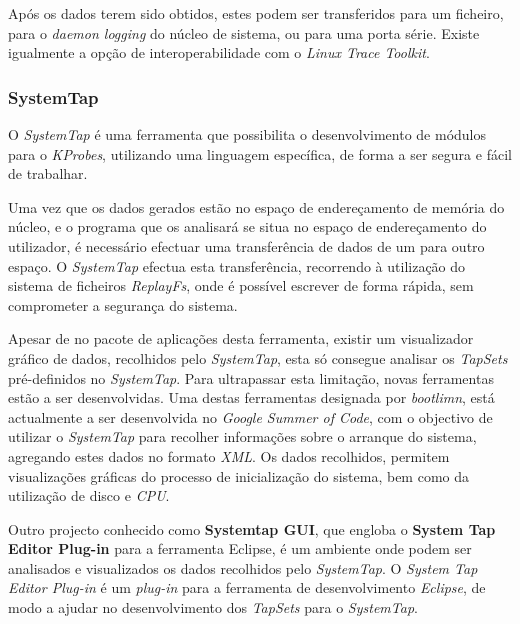 Após os dados terem sido obtidos, estes podem ser transferidos para um ficheiro, para o \textit{daemon logging} do núcleo de sistema, ou para uma porta série.
Existe igualmente a opção de interoperabilidade com o \textit{Linux Trace Toolkit}\cite{:DProbes}.

\subsubsection{SystemTap}\label{cap:Systemtap_overview}
O \textit{SystemTap} é uma ferramenta que possibilita o desenvolvimento de módulos para o \textit{KProbes}, utilizando uma linguagem específica, de forma a ser segura e fácil de trabalhar.



Uma vez que os dados gerados estão no espaço de endereçamento de memória do núcleo, e o programa que os analisará se situa no espaço de endereçamento do utilizador, é necessário efectuar uma transferência de dados de um para outro espaço.
O \textit{SystemTap} efectua esta transferência, recorrendo à utilização do sistema de ficheiros \textit{ReplayFs}, onde é possível escrever de forma rápida, sem comprometer a segurança do sistema.\cite{Donovan2007,Jones2009}

Apesar de no pacote de aplicações desta ferramenta, existir um visualizador gráfico de dados, recolhidos pelo \textit{SystemTap}, esta só consegue analisar os \textit{TapSets} pré-definidos no \textit{SystemTap}.
Para ultrapassar esta limitação, novas ferramentas estão a ser desenvolvidas.
Uma destas ferramentas designada por \textit{bootlimn}, está actualmente a ser desenvolvida no \textit{Google Summer of Code}, com o objectivo de utilizar o \textit{SystemTap} para recolher informações sobre o arranque do sistema, agregando estes dados no formato \textit{XML}.
Os dados recolhidos, permitem visualizações gráficas do processo de inicialização do sistema, bem como da utilização de disco e \textit{CPU}.

Outro projecto conhecido como \textbf{Systemtap GUI}, que engloba o \textbf{System Tap Editor Plug-in} para a ferramenta Eclipse, é um ambiente onde podem ser analisados e visualizados os dados recolhidos pelo \textit{SystemTap}.
O \textit{System Tap Editor Plug-in} é um \textit{plug-in} para a ferramenta de desenvolvimento \textit{Eclipse}, de modo a ajudar no desenvolvimento dos \textit{TapSets} para o \textit{SystemTap}.

